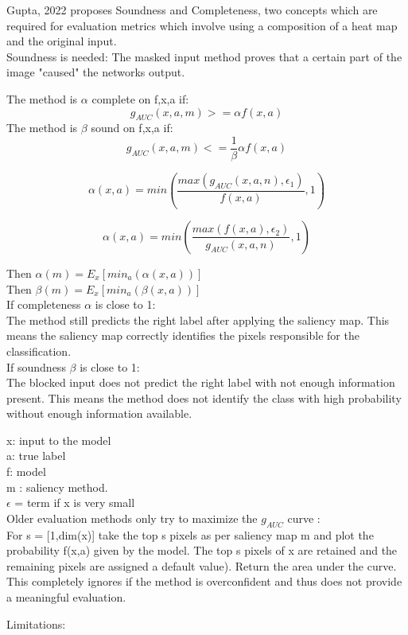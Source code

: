 Gupta, 2022 \cite{gupta2022new} proposes Soundness and Completeness, two concepts which are required for evaluation metrics which involve using a composition of a heat map and the original input.\\
Soundness is needed: The masked input method proves that a certain part of the image "caused" the networks output. 

The method is $\alpha$ complete on f,x,a if:
$$ g_{AUC} (x,a,m) >= \alpha f(x,a)$$
The method is $\beta$ sound on f,x,a if:
$$ g_{AUC} (x,a,m) <= \frac{1}{\beta}\alpha f(x,a)$$

$$\alpha(x,a) = min(\frac{max(g_{AUC}(x,a,n),\epsilon_1)}{f(x,a)},1)$$

$$\alpha(x,a)=min(\frac{max(f(x,a),\epsilon_2)}{g_{AUC}(x,a,n)},1)$$

Then $\alpha(m) = E_x[min_a(\alpha(x,a))]$\\
Then $\beta(m) = E_x[min_a(\beta(x,a))]$\\
If completeness $\alpha$ is close to 1:\\ The method still predicts the right label after applying the saliency map. This means the saliency map correctly identifies the pixels responsible for the classification.\\
If soundness $\beta$ is close to 1:\\ The blocked input does not predict the right label with not enough information present. This means the method does not identify the class with high probability without enough information available.

x: input to the model \\
a: true label \\
f: model\\
m : saliency method.\\
$\epsilon$ = term if x is very small\\


Older evaluation methods only try to maximize the $g_{AUC}$ curve \cite{petsiuk2018rise}:\\
For s = [1,dim(x)] take the top s pixels as per saliency map m and plot the probability f(x,a) given by the model. The top s pixels of x are retained and the  remaining pixels are assigned a default value). Return the area under the curve.\\

This completely ignores if the method is overconfident and thus does not provide a meaningful evaluation.

Limitations:\\

